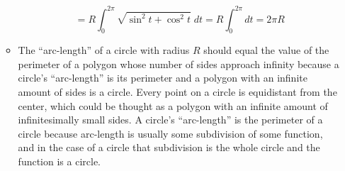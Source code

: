 \documentclass[11pt]{article}
\begin{document}
\begin{enumerate}[a)]
\begin{itemize}
			\begin{equation*}
			=	R \int_0^{2\pi}\sqrt{\sin^2 t + \cos^2 t}\;dt = 
			R \int_0^{2\pi} dt = 
			2 \pi R
			\end{equation*}
					
					
			\item The ``arc-length'' of a circle with radius $R$ should equal the 
			value of the perimeter of a polygon whose number of sides approach infinity because
			a circle's ``arc-length'' is its perimeter and a polygon with an infinite
			amount of sides is a circle. Every point on a circle is equidistant from the
			center, which could be thought as a polygon with an infinite amount of 
			infinitesimally small sides. A circle's ``arc-length'' is the perimeter of a circle because
			arc-length is usually some subdivision of some function, and in 
			the case of a circle that subdivision is the whole circle and the function
			is a circle.	
				
		\end{itemize}
		
\end{enumerate}
\end{document}
